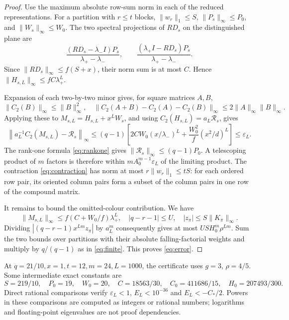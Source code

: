 \documentclass[11pt,a4paper]{article}
\theoremstyle{remark}\newtheorem{remark}[theorem]{Remark}
\newcommand{\R}{\mathcal R}\newcommand{\CC}{\mathcal C}
\begin{document}
\begin{proof}
Use the maximum absolute row-sum norm in each of the reduced representations. For a partition with $r\le t$ blocks, $\|w_r\|_1\le S$, $\|P_s\|_\infty\le P_0$, and $\|W_s\|_\infty\le W_0$. The two spectral projections of $RD_s$ on the distinguished plane are
\[
\frac{(RD_s-\lambda_-I)P_s}{\lambda_+-\lambda_-},\qquad
\frac{(\lambda_+I-RD_s)P_s}{\lambda_+-\lambda_-}.
\]
Since $\|RD_s\|_\infty\le f(S+x)$, their norm sum is at most $C$. Hence
$\|H_{s,L}\|_\infty\le fC\lambda_+^L$.

Expansion of each two-by-two minor gives, for square matrices $A,B$,
\[
\|C_2(B)\|_\infty\le\|B\|_\infty^2,
\quad
\|C_2(A+B)-C_2(A)-C_2(B)\|_\infty
\le2\|A\|_\infty\|B\|_\infty.
\]
Applying these to $M_{s,L}=H_{s,L}+x^LW_s$, and using
$C_2(H_{s,L})=a_L\R_s$, gives
\[
\left\|a_L^{-1}C_2(M_{s,L})-\R_s\right\|_\infty
\le(q-1)\left[2CW_0(x/\lambda_-)^L+
\frac{W_0^2}{f}(x^2/d)^L\right]\le\varepsilon_L.
\]
The rank-one formula \eqref{eq:rankone} gives
$\|\R_s\|_\infty\le(q-1)P_0$. A telescoping product of $m$ factors is therefore within
$mA_0^{m-1}\varepsilon_L$ of the limiting product. The contraction \eqref{eq:contraction} has norm at most $r\|w_r\|_1\le tS$: for each ordered row pair, its oriented column pairs form a subset of the column pairs in one row of the compound matrix.

It remains to bound the omitted-colour contribution. We have
\[
\|M_{s,L}\|_\infty\le f(C+W_0/f)\lambda_+^L,
\quad |q-r-1|\le U,
\quad |z_\pi|\le S\|K_\pi\|_\infty.
\]
Dividing $|(q-r-1)x^{Lm}z_\pi|$ by $a_L^m$ consequently gives at most
$US H_0^m\rho^{Lm}$. Sum the two bounds over partitions with their absolute falling-factorial weights and multiply by $q/(q-1)$ as in \eqref{eq:finite}. This proves \eqref{eq:error}.
\end{proof}
At $q=21/10,x=1,t=12,m=24,L=1000$, the certificate uses $g=3$, $\rho=4/5$. Some intermediate exact constants are
\[
S=219/10,\quad P_0=19,\quad W_0=20,\quad
C=18563/30,\quad C_0=411686/15,\quad H_0=207493/300.
\]
Direct rational comparisons verify $\varepsilon_L<1$, $E_L<10^{-36}$ and $E_L<-C_*/2$. Powers in these comparisons are computed as integers or rational numbers; logarithms and floating-point eigenvalues are not proof dependencies.
\end{document}
